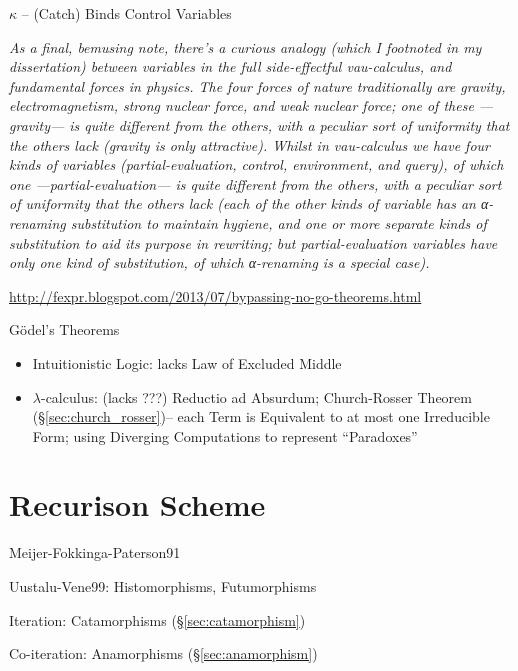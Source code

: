 $\kappa$ -- (Catch) Binds Control Variables

\emph{As a final, bemusing note, there's a curious analogy (which I
  footnoted in my dissertation) between variables in the full
  side-effectful vau-calculus, and fundamental forces in physics. The
  four forces of nature traditionally are gravity, electromagnetism,
  strong nuclear force, and weak nuclear force; one of these —gravity—
  is quite different from the others, with a peculiar sort of
  uniformity that the others lack (gravity is only attractive). Whilst
  in vau-calculus we have four kinds of variables (partial-evaluation,
  control, environment, and query), of which one —partial-evaluation—
  is quite different from the others, with a peculiar sort of
  uniformity that the others lack (each of the other kinds of variable
  has an α-renaming substitution to maintain hygiene, and one or more
  separate kinds of substitution to aid its purpose in rewriting; but
  partial-evaluation variables have only one kind of substitution, of
  which α-renaming is a special case).}


\url{http://fexpr.blogspot.com/2013/07/bypassing-no-go-theorems.html}

G\"odel's Theorems

\begin{itemize}
\item Intuitionistic Logic: lacks Law of Excluded Middle
\item $\lambda$-calculus: (lacks ???) Reductio ad Absurdum;
  Church-Rosser Theorem (\S\ref{sec:church_rosser})-- each Term is
  Equivalent to at most one Irreducible Form; using
  Diverging Computations to represent ``Paradoxes''
\end{itemize}



\section{Recurison Scheme}\label{sec:recursion_scheme}

Meijer-Fokkinga-Paterson91 %

Uustalu-Vene99: Histomorphisms, Futumorphisms

Iteration: Catamorphisms (\S\ref{sec:catamorphism})

Co-iteration: Anamorphisms (\S\ref{sec:anamorphism})

